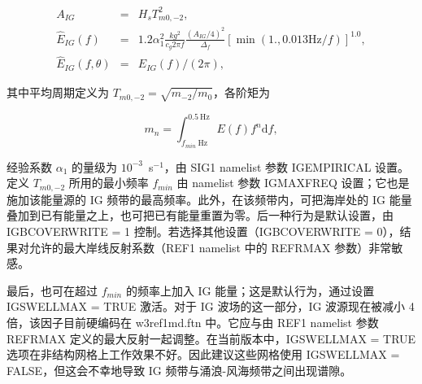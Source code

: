 \begin{eqnarray}
 A_{IG} & =&    H_s T_{m0,-2}^2\label{eq:IGfit0}, \\
\widehat{E}_{IG}(f)& = & 1.2 \alpha_1^2 \frac{k g^2}{c_g 2 \pi f} \frac{(A_{IG}/4)^2}{\Delta_f}  
\left[\min( 1., 0.013\mathrm{Hz}/ f)\right]^{1.0}, \label{eq:IGfit1} \\
 \widehat{E}_{IG}(f,\theta) & = & \widehat{E}_{IG}(f) / (2 \pi ),
\label{eq:fit2} 
\end{eqnarray}

\noindent
其中平均周期定义为 $ T_{m0,-2} =\sqrt{m_{-2}/m_{0}}$，各阶矩为

\begin{equation}
 m_n= \int_{f_{min}~\mathrm{Hz}}^{0.5~\mathrm{Hz}} E(f) f^n {\mathrm d}f,\label{eq:mn}
\end{equation}

\noindent
经验系数 $\alpha_1$ 的量级为 $10^{-3}$~s$^{-1}$，由 {\code SIG1} namelist 参数 {\code IGEMPIRICAL} 设置。定义 $ T_{m0,-2}$ 所用的最小频率 $f_{min}$ 由 namelist 参数 {\code IGMAXFREQ} 设置；它也是施加该能量源的 IG 频带的最高频率。此外，在该频带内，可把海岸处的 IG 能量叠加到已有能量之上，也可把已有能量重置为零。后一种行为是默认设置，由 {\code IGBCOVERWRITE = 1} 控制。若选择其他设置（{\code IGBCOVERWRITE = 0}），结果对允许的最大岸线反射系数（{\F REF1} namelist 中的 {\code REFRMAX} 参数）非常敏感。

最后，也可在超过 $f_{min}$ 的频率上加入 IG 能量；这是默认行为，通过设置 {\code IGSWELLMAX = TRUE} 激活。对于 IG 波场的这一部分，IG 波源现在被减小 4 倍，该因子目前硬编码在 {\file w3ref1md.ftn} 中。它应与由 {\F REF1} namelist 参数 {\code REFRMAX} 定义的最大反射一起调整。在当前版本中，{\code IGSWELLMAX = TRUE} 选项在非结构网格上工作效果不好。因此建议这些网格使用 {\code IGSWELLMAX = FALSE}，但这会不幸地导致 IG 频带与涌浪-风海频带之间出现谱隙。




